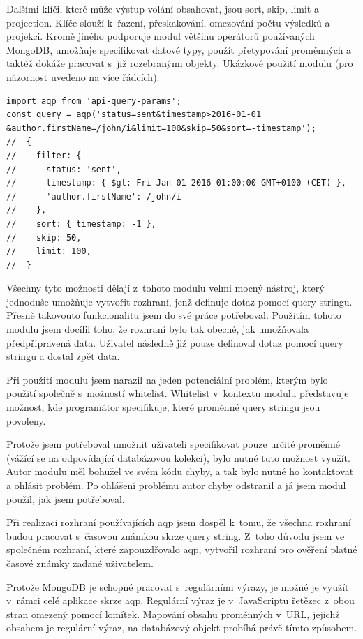 \documentclass[thesis=M,czech]{FITthesis}[2012/06/26]
\begin{document}
      Dalšími klíči, které může výstup volání obsahovat, jsou sort, skip, limit a projection.
      Klíče slouží k~řazení, přeskakování, omezování počtu výsledků a projekci.
      Kromě jiného podporuje modul většinu operátorů používaných MongoDB, umožňuje specifikovat datové typy, 
      použít přetypování proměnných a taktéž dokáže pracovat s~již rozebranými objekty.
      Ukázkové použití modulu \cite{aqp} (pro názornost uvedeno na více řádcích):
      \begin{verbatim}
import aqp from 'api-query-params';
const query = aqp('status=sent&timestamp>2016-01-01
&author.firstName=/john/i&limit=100&skip=50&sort=-timestamp');
//  { 
//    filter: { 
//      status: 'sent', 
//      timestamp: { $gt: Fri Jan 01 2016 01:00:00 GMT+0100 (CET) }, 
//      'author.firstName': /john/i 
//    }, 
//    sort: { timestamp: -1 }, 
//    skip: 50, 
//    limit: 100, 
//  } 
      \end{verbatim}
      
      Všechny tyto možnosti dělají z~tohoto modulu velmi mocný nástroj,
      který jednoduše umožňuje vytvořit rozhraní, jenž definuje dotaz pomocí query stringu.
      Přesně takovouto funkcionalitu jsem do své práce potřeboval.
      Použitím tohoto modulu jsem docílil toho, 
      že rozhraní bylo tak obecné, jak umožňovala předpřipravená data.
      Uživatel následně již pouze definoval dotaz pomocí query stringu a dostal zpět data.

      Při použití modulu jsem narazil na jeden potenciální problém,
      kterým bylo použití společně s~možností whitelist.
      Whitelist v~kontextu modulu představuje možnost, kde programátor
      specifikuje, které proměnné query stringu jsou povoleny.

      Protože jsem potřeboval umožnit uživateli specifikovat pouze určité
      proměnné (vážící se na odpovídající databázovou kolekci),
      bylo nutné tuto možnost využít.
      Autor modulu měl bohužel ve svém kódu chyby, a tak bylo nutné
      ho kontaktovat a ohlásit problém. 
      Po ohlášení problému autor chyby odstranil a já jsem modul použil, jak jsem potřeboval.

      Při realizaci rozhraní používajících aqp jsem dospěl k~tomu, 
      že všechna rozhraní budou pracovat s~časovou známkou skrze query string.
      Z~toho důvodu jsem ve společném rozhraní, 
      které zapouzdřovalo aqp, vytvořil rozhraní pro ověření platné časové známky zadané uživatelem.

      Protože MongoDB je schopné pracovat s~regulárními výrazy,
      je možné je využít v~rámci celé aplikace skrze aqp.
      Regulární výraz je v~JavaScriptu řetězec z~obou stran omezený pomocí lomítek.
      Mapování obsahu proměnných v~URL, jejichž obsahem je regulární výraz, na databázový objekt probíhá právě
      tímto způsobem.
\end{document}
